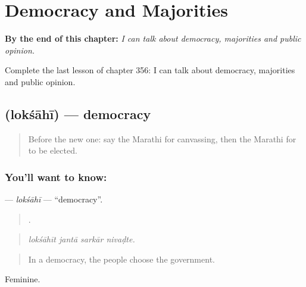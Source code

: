 
\chapter{Democracy and Majorities}
\label{ch:mr-democracy-and-majorities}

\begin{chapteropening}
\textbf{By the end of this chapter:} \emph{I can talk about democracy, majorities and public opinion.}

Complete the last lesson of chapter 356: I can talk about democracy, majorities and public opinion.
\end{chapteropening}

\section[\texorpdfstring{\mr{लोकशाही} (lokśāhī)}{लोकशाही (lokśāhī)}]{ (lokśāhī) — democracy}

\label{lesson:MR-C356-loksahi}



\begin{quote}
Before the new one: say the Marathi for canvassing, then the Marathi for to be elected.
\end{quote}

\subsection*{You'll want to know: }
\textbf{} — \emph{lokśāhī} — \textquotedblleft{}democracy\textquotedblright{}.

\begin{quote}
   .
\end{quote}

\begin{quote}
\emph{lokśāhīt jantā sarkār nivaḍte.}
\end{quote}

\begin{quote}
In a democracy, the people choose the government.
\end{quote}

Feminine.

